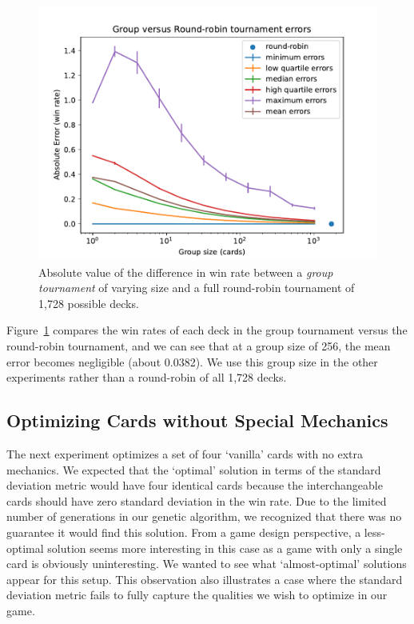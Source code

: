 \documentclass[letterpaper]{article} %
\begin{document}
\begin{figure}[t]
	\centering
	\includegraphics[width=0.9\columnwidth]{group_vs_rr_fig}
	\caption{Absolute value of the difference in win rate between a \textit{group tournament} of varying size and a full round-robin tournament of 1,728 possible decks. %
	}
	\label{fig:group_vs_rr}
\end{figure}


Figure~\ref{fig:group_vs_rr} compares the win rates of each deck in the group tournament versus the round-robin tournament, and we can see that at a group size of 256, the mean error becomes negligible (about 0.0382). We use this group size in the other experiments rather than a round-robin of all 1,728 decks.


 \subsection{Optimizing Cards without Special Mechanics}

The next experiment optimizes a set of four `vanilla' cards with no extra mechanics. We expected that the `optimal' solution in terms of the standard deviation metric would have four identical cards because the interchangeable cards should have zero standard deviation in the win rate. Due to the limited number of generations in our genetic algorithm, we recognized that there was no guarantee it would find this solution. From a game design perspective, a less-optimal solution seems more interesting in this case as a game with only a single card is obviously uninteresting. We wanted to see what `almost-optimal' solutions appear for this setup. This observation also illustrates a case where the standard deviation metric fails to fully capture the qualities we wish to optimize in our game.
\end{document}

